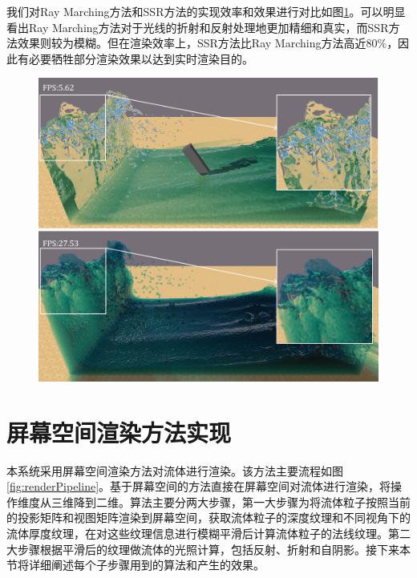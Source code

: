 我们对Ray Marching方法和SSR方法的实现效率和效果进行对比如图\ref{fig:render1}。可以明显看出Ray Marching方法对于光线的折射和反射处理地更加精细和真实，而SSR方法效果则较为模糊。但在渲染效率上，SSR方法比Ray Marching方法高近$80\%$，因此有必要牺牲部分渲染效果以达到实时渲染目的。

\begin{figure}[ht]
    \centering
    \includegraphics[width=12cm]{image/render1.png}
    \label{fig:render1}
\end{figure}

\section{屏幕空间渲染方法实现}

本系统采用屏幕空间渲染方法对流体进行渲染。该方法主要流程如图\ref{fig:renderPipeline}。基于屏幕空间的方法直接在屏幕空间对流体进行渲染，将操作维度从三维降到二维。算法主要分两大步骤，第一大步骤为将流体粒子按照当前的投影矩阵和视图矩阵渲染到屏幕空间，获取流体粒子的深度纹理和不同视角下的流体厚度纹理，在对这些纹理信息进行模糊平滑后计算流体粒子的法线纹理。第二大步骤根据平滑后的纹理做流体的光照计算，包括反射、折射和自阴影。接下来本节将详细阐述每个子步骤用到的算法和产生的效果。


